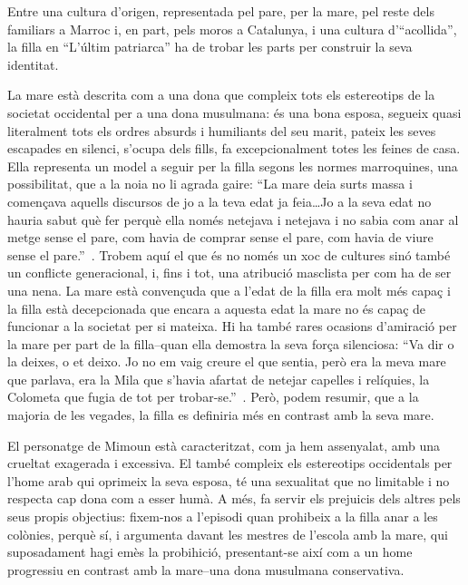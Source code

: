 Entre una cultura d'origen, representada pel pare, per la mare, pel reste dels familiars a Marroc i, en part, pels moros a Catalunya, i una cultura d'``acollida'', la filla en ``L'últim patriarca'' ha de trobar les parts per construir la seva identitat.

La mare està descrita com a una dona que compleix tots els estereotips de la societat occidental per a una dona musulmana:
és una bona esposa, segueix quasi literalment tots els ordres absurds i humiliants del seu marit, pateix les seves escapades en silenci, s'ocupa dels fills, fa excepcionalment totes les feines de casa.
Ella representa un model a seguir per la filla segons les normes marroquines, una possibilitat, que a la noia no li agrada gaire:
``La mare deia surts massa i començava aquells discursos de jo a la teva edat ja feia\ldots Jo a la seva edat no hauria sabut què fer perquè ella només netejava i netejava i no sabia com anar al metge sense el pare, com havia de comprar sense el pare, com havia de viure sense el pare.''~\autocite[188]{ElHachmi2008}.
Trobem aquí el que és no només un xoc de cultures sinó també un conflicte generacional, i, fins i tot, una atribució masclista per com ha de ser una nena.
La mare està convençuda que a l'edat de la filla era molt més capaç i la filla està decepcionada que encara a aquesta edat la mare no és capaç de funcionar a la societat per si mateixa.
Hi ha també rares ocasions d'amiració per la mare per part de la filla--quan ella demostra la seva força silenciosa:
``Va dir o la deixes, o et deixo. Jo no em vaig creure el que sentia, però era la meva mare que parlava, era la Mila que s'havia afartat de netejar capelles i relíquies, la Colometa que fugia de tot per trobar-se.''~\autocite[222]{ElHachmi2008}.
Però, podem resumir, que a la majoria de les vegades, la filla es definiria més en contrast amb la seva mare.

El personatge de Mimoun està caracteritzat, com ja hem assenyalat, amb una crueltat exagerada i excessiva.
El també compleix els estereotips occidentals per l'home arab qui oprimeix la seva esposa, té una sexualitat que no limitable i no respecta cap dona com a esser humà.
A més, fa servir els prejuicis dels altres pels seus propis objectius:
fixem-nos a l'episodi quan prohibeix a la filla anar a les colònies, perquè sí, i argumenta davant les mestres de l'escola amb la mare, qui suposadament hagi emès la probihició, presentant-se així com a un home progressiu en contrast amb la mare--una dona musulmana conservativa.

